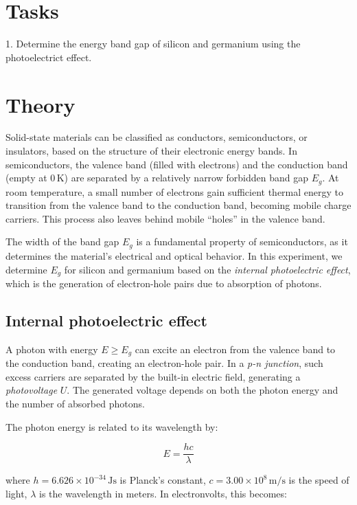 \documentclass[english,11pt,a4paper]{article}
\begin{document}
	\begin{multicols}{2}
		\section{Tasks}
	
	1. Determine the energy band gap of silicon and germanium using the photoelectrict effect.

		\section{Theory}
		
		Solid-state materials can be classified as conductors, semiconductors, or insulators, based on the structure of their electronic energy bands. In semiconductors, the valence band (filled with electrons) and the conduction band (empty at $0\,\mathrm{K}$) are separated by a relatively narrow forbidden band gap $E_g$. At room temperature, a small number of electrons gain sufficient thermal energy to transition from the valence band to the conduction band, becoming mobile charge carriers. This process also leaves behind mobile “holes” in the valence band.
		
		The width of the band gap $E_g$ is a fundamental property of semiconductors, as it determines the material's electrical and optical behavior. In this experiment, we determine $E_g$ for silicon and germanium based on the \emph{internal photoelectric effect}, which is the generation of electron-hole pairs due to absorption of photons.
		
		\subsection{Internal photoelectric effect}
		
		A photon with energy $E \geq E_g$ can excite an electron from the valence band to the conduction band, creating an electron-hole pair. In a \textit{p-n junction}, such excess carriers are separated by the built-in electric field, generating a \emph{photovoltage} $U$. The generated voltage depends on both the photon energy and the number of absorbed photons.
		
		The photon energy is related to its wavelength by:
		
	
		\begin{equation}
			E = \frac{hc}{\lambda}
		\end{equation}
	
		
		where  
		$h = 6.626 \times 10^{-34} \, \mathrm{Js}$ is Planck's constant,  
		$c = 3.00 \times 10^8 \, \mathrm{m/s}$ is the speed of light,  
		$\lambda$ is the wavelength in meters.  
		In electronvolts, this becomes:
		

\end{multicols}
\end{document}
